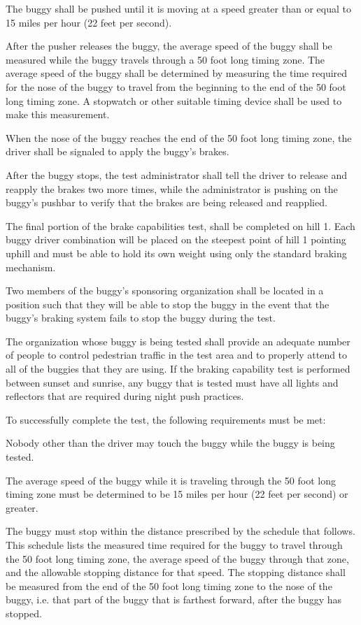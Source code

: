 \documentclass[openany]{book}
\begin{document}
The buggy shall be pushed until it is moving at a speed greater than or equal to 15 miles per hour (22 feet per second).

After the pusher releases the buggy, the average speed of the buggy shall be measured while the buggy travels through a 50 foot long timing zone. The average speed of the buggy shall be determined by measuring the time required for the nose of the buggy to travel from the beginning to the end of the 50 foot long timing zone. A stopwatch or other suitable timing device shall be used to make this measurement.

When the nose of the buggy reaches the end of the 50 foot long timing zone, the driver shall be signaled to apply the buggy's brakes.

After the buggy stops, the test administrator shall tell the driver to release and reapply the brakes two more times, while the administrator is pushing on the buggy's pushbar to verify that the brakes are being released and reapplied.

The final portion of the brake capabilities test, shall be completed on hill 1. Each buggy driver combination will be placed on the steepest point of hill 1 pointing uphill and must be able to hold its own weight using only the standard braking mechanism.

Two members of the buggy's sponsoring organization shall be located in a position such that they will be able to stop the buggy in the event that the buggy's braking system fails to stop the buggy during the test.

The organization whose buggy is being tested shall provide an adequate number of people to control pedestrian traffic in the test area and to properly attend to all of the buggies that they are using. If the braking capability test is performed between sunset and sunrise, any buggy that is tested must have all lights and reflectors that are required during night push practices.

To successfully complete the test, the following requirements must be met:

Nobody other than the driver may touch the buggy while the buggy is being tested.

The average speed of the buggy while it is traveling through the 50 foot long timing zone must be determined to be 15 miles per hour (22 feet per second) or greater.

The buggy must stop within the distance prescribed by the schedule that follows. This schedule lists the measured time required for the buggy to travel through the 50 foot long timing zone, the average speed of the buggy through that zone, and the allowable stopping distance for that speed. The stopping distance shall be measured from the end of the 50 foot long timing zone to the nose of the buggy, i.e. that part of the buggy that is farthest forward, after the buggy has stopped.
\end{document}
